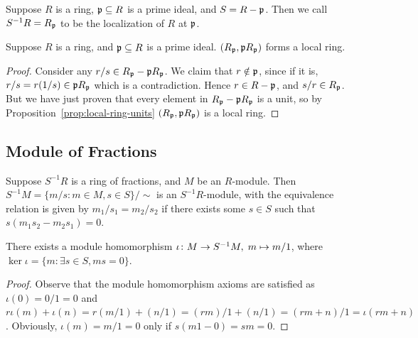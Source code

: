 \begin{definition}
    Suppose \(R\) is a ring, \(\mathfrak{p} \subseteq R\) is a prime ideal,
    and \(S = R - \mathfrak{p}\).
    Then we call \(S^{-1}R = R_{\mathfrak{p}}\) to be the localization of \(R\) at \(\mathfrak{p}\).
\end{definition}
\begin{proposition}\label{prop:prime-local-ring}
    Suppose \(R\) is a ring, and \(\mathfrak{p} \subseteq R\) is a prime ideal.
    \((R_{\mathfrak{p}},\mathfrak{p}R_{\mathfrak{p}})\) forms a local ring.
\end{proposition}
\begin{proof}
    Consider any \(r/s \in R_{\mathfrak{p}} - \mathfrak{p}R_{\mathfrak{p}}\).
    We claim that \(r \notin \mathfrak{p}\),
    since if it is, \(r/s = r(1/s) \in \mathfrak{p}R_{\mathfrak{p}}\) which is a contradiction.
    Hence \(r \in R - \mathfrak{p}\), and \(s/r \in R_{\mathfrak{p}}\).
    But we have just proven that every element in \(R_{\mathfrak{p}} - \mathfrak{p}R_{\mathfrak{p}}\) is a unit,
    so by Proposition~\ref{prop:local-ring-units} \((R_{\mathfrak{p}},\mathfrak{p}R_{\mathfrak{p}})\) is a local ring.
\end{proof}

\subsection*{Module of Fractions}

\begin{definition}
    Suppose \(S^{-1}R\) is a ring of fractions, and \(M\) be an \(R\)-module.
    Then \(S^{-1}M = \{m/s : m \in M, s \in S\}/{\sim}\) is an \(S^{-1}R\)-module,
    with the equivalence relation is given by \(m_1/s_1 = m_2/s_2\)
    if there exists some \(s \in S\) such that \(s(m_1s_2 - m_2s_1) = 0\).
\end{definition}
\begin{proposition}
    There exists a module homomorphism \(\iota\colon M\to S^{-1}M,\;m\mapsto m/1\),
    where \(\ker\iota = \{m : \exists s \in S, ms = 0\}\).
\end{proposition}
\begin{proof}
    Observe that the module homomorphism axioms are satisfied as
    \(\iota(0) = 0/1 = 0\) and
    \(r\iota(m)+\iota(n) = r(m/1)+(n/1) = (rm)/1+(n/1) = (rm+n)/1 = \iota(rm+n)\).
    Obviously, \(\iota(m) = m/1 = 0\) only if \(s(m1 - 0) = sm = 0\).
\end{proof}

